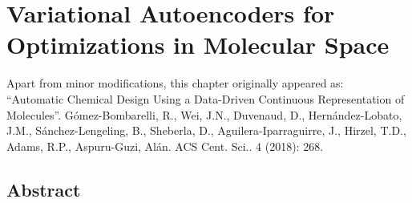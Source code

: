 \chapter{Variational Autoencoders for Optimizations in Molecular Space}
\thispagestyle{plain}
\vspace{-.5cm}

\noindent Apart from minor modifications, this chapter originally appeared as:\newline\\
\ssp ``Automatic Chemical Design Using a Data-Driven Continuous Representation of Molecules''. 
Gómez-Bombarelli, R., Wei, J.N., Duvenaud, D., Hernández-Lobato, J.M., Sánchez-Lengeling, B., Sheberla, D., Aguilera-Iparraguirre, J., Hirzel, T.D., Adams, R.P., Aspuru-Guzi, Alán. ACS Cent. Sci.. 4 (2018): 268.

\section*{Abstract}
    \dsp
    


